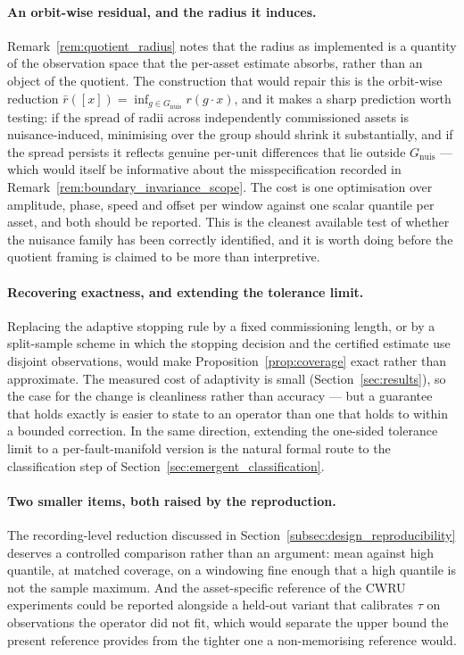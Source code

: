 \documentclass[a4paper]{cas-sc}
\newcommand{\Gnuis}{\ensuremath{G_{\mathrm{nuis}}}}
\begin{document}
\paragraph{An orbit-wise residual, and the radius it induces.}
Remark~\ref{rem:quotient_radius} notes that the radius as implemented is a
quantity of the observation space that the per-asset estimate absorbs, rather
than an object of the quotient. The construction that would repair this is the
orbit-wise reduction \(\bar r([x]) = \inf_{g \in \Gnuis} r(g\cdot x)\), and it
makes a sharp prediction worth testing: if the spread of radii across
independently commissioned assets is nuisance-induced, minimising over the
group should shrink it substantially, and if the spread persists it reflects
genuine per-unit differences that lie outside \(\Gnuis\) --- which would itself
be informative about the misspecification recorded in
Remark~\ref{rem:boundary_invariance_scope}. The cost is one optimisation over
amplitude, phase, speed and offset per window against one scalar quantile per
asset, and both should be reported. This is the cleanest available test of
whether the nuisance family has been correctly identified, and it is worth
doing before the quotient framing is claimed to be more than interpretive.

\paragraph{Recovering exactness, and extending the tolerance limit.}
Replacing the adaptive stopping rule by a fixed commissioning length, or by a
split-sample scheme in which the stopping decision and the certified estimate
use disjoint observations, would make Proposition~\ref{prop:coverage} exact
rather than approximate. The measured cost of adaptivity is small
(Section~\ref{sec:results}), so the case for the change is cleanliness rather
than accuracy --- but a guarantee that holds exactly is easier to state to an
operator than one that holds to within a bounded correction. In the same
direction, extending the one-sided tolerance limit to a per-fault-manifold
version is the natural formal route to the classification step of
Section~\ref{sec:emergent_classification}.

\paragraph{Two smaller items, both raised by the reproduction.}
The recording-level reduction discussed in
Section~\ref{subsec:design_reproducibility} deserves a controlled comparison
rather than an argument: mean against high quantile, at matched coverage, on
a windowing fine enough that a high quantile is not the sample maximum. And
the asset-specific reference of the CWRU experiments could be reported
alongside a held-out variant that calibrates \(\tau\) on observations the
operator did not fit, which would separate the upper bound the present
reference provides from the tighter one a non-memorising reference would.
\end{document}

